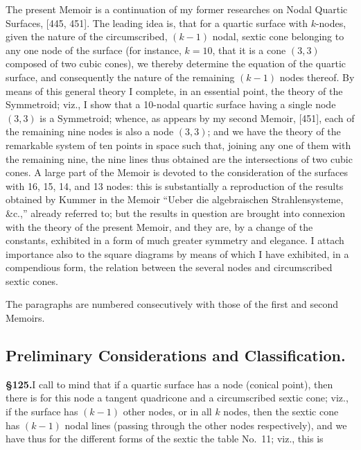 \documentclass[11pt,a4paper]{article}
\begin{document}
The present Memoir is a continuation of my former researches on Nodal Quartic Surfaces, [445, 451]. The leading idea is, that for a quartic surface with $k$-nodes, given the nature of the circumscribed, $(k - 1)$ nodal, sextic cone belonging to any one node of the surface (for instance, $k = 10$, that it is a cone $(3, 3)$ composed of two cubic cones), we thereby determine the equation of the quartic surface, and consequently the nature of the remaining $(k - 1)$ nodes thereof. By means of this general theory I complete, in an essential point, the theory of the Symmetroid; viz., I show that a 10-nodal quartic surface having a single node $(3, 3)$ is a Symmetroid; whence, as appears by my second Memoir, [451], each of the remaining nine nodes is also a node $(3, 3)$; and we have the theory of the remarkable system of ten points in space such that, joining any one of them with the remaining nine, the nine lines thus obtained are the intersections of two cubic cones. A large part of the Memoir is devoted to the consideration of the surfaces with 16, 15, 14, and 13 nodes: this is substantially a reproduction of the results obtained by Kummer in the Memoir ``Ueber die algebraischen Strahlensysteme, \&c.,'' already referred to; but the results in question are brought into connexion with the theory of the present Memoir, and they are, by a change of the constants, exhibited in a form of much greater symmetry and elegance. I attach importance also to the square diagrams by means of which I have exhibited, in a compendious form, the relation between the several nodes and circumscribed sextic cones.

The paragraphs are numbered consecutively with those of the first and second Memoirs.

\subsection*{Preliminary Considerations and Classification.}

\textbf{\S 125.}\quad I call to mind that if a quartic surface has a node (conical point), then there is for this node a tangent quadricone and a circumscribed sextic cone; viz., if the surface has $(k - 1)$ other nodes, or in all $k$ nodes, then the sextic cone has $(k - 1)$ nodal lines (passing through the other nodes respectively), and we have thus for the different forms of the sextic the table No.~11; viz., this is
\end{document}
